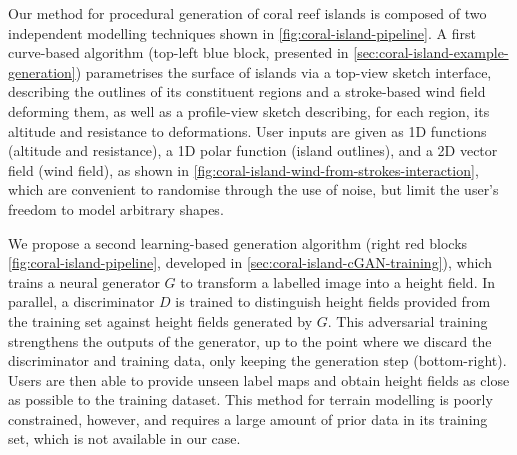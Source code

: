 




Our method for procedural generation of coral reef islands is composed of two independent modelling techniques shown in \cref{fig:coral-island-pipeline}. A first curve-based algorithm (top-left blue block, presented in \cref{sec:coral-island-example-generation}) parametrises the surface of islands via a top-view sketch interface, describing the outlines of its constituent regions and a stroke-based wind field deforming them, as well as a profile-view sketch describing, for each region, its altitude and resistance to deformations. User inputs are given as 1D functions (altitude and resistance), a 1D polar function (island outlines), and a 2D vector field (wind field), as shown in \cref{fig:coral-island-wind-from-strokes-interaction}, which are convenient to randomise through the use of noise, but limit the user's freedom to model arbitrary shapes.

We propose a second learning-based generation algorithm (right red blocks \cref{fig:coral-island-pipeline}, developed in \cref{sec:coral-island-cGAN-training}), which trains a neural generator $G$ to transform a labelled image into a height field. In parallel, a discriminator $D$ is trained to distinguish height fields provided from the training set against height fields generated by $G$. This adversarial training strengthens the outputs of the generator, up to the point where we discard the discriminator and training data, only keeping the generation step (bottom-right). Users are then able to provide unseen label maps and obtain height fields as close as possible to the training dataset. This method for terrain modelling is poorly constrained, however, and requires a large amount of prior data in its training set, which is not available in our case.


